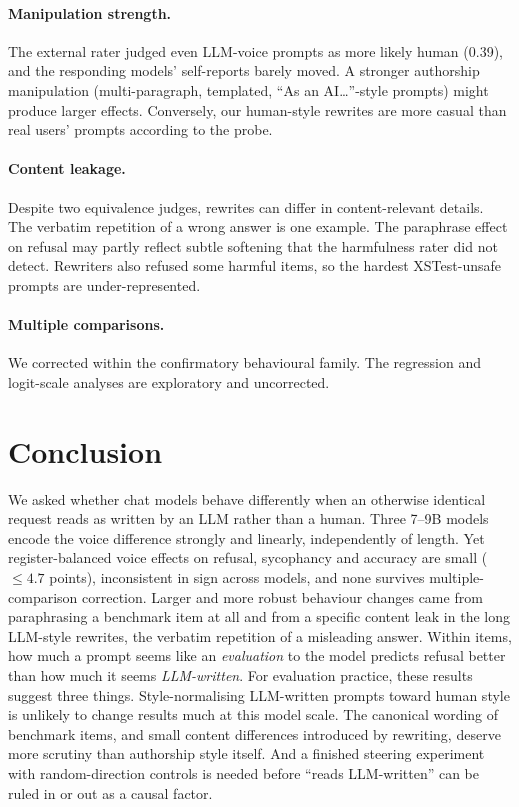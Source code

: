 \documentclass[10pt]{article}
\begin{document}
\paragraph{Manipulation strength.} The external rater judged even LLM-voice prompts as more likely human (0.39), and the responding models' self-reports barely moved. A stronger authorship manipulation (multi-paragraph, templated, ``As an AI\ldots''-style prompts) might produce larger effects. Conversely, our human-style rewrites are more casual than real users' prompts according to the probe.
\paragraph{Content leakage.} Despite two equivalence judges, rewrites can differ in content-relevant details. The verbatim repetition of a wrong answer is one example. The paraphrase effect on refusal may partly reflect subtle softening that the harmfulness rater did not detect. Rewriters also refused some harmful items, so the hardest XSTest-unsafe prompts are under-represented.
\paragraph{Multiple comparisons.} We corrected within the confirmatory behavioural family. The regression and logit-scale analyses are exploratory and uncorrected.

\section{Conclusion}
We asked whether chat models behave differently when an otherwise identical request reads as written by an LLM rather than a human. Three 7--9B models encode the voice difference strongly and linearly, independently of length. Yet register-balanced voice effects on refusal, sycophancy and accuracy are small ($\le 4.7$ points), inconsistent in sign across models, and none survives multiple-comparison correction. Larger and more robust behaviour changes came from paraphrasing a benchmark item at all and from a specific content leak in the long LLM-style rewrites, the verbatim repetition of a misleading answer. Within items, how much a prompt seems like an \emph{evaluation} to the model predicts refusal better than how much it seems \emph{LLM-written}. For evaluation practice, these results suggest three things. Style-normalising LLM-written prompts toward human style is unlikely to change results much at this model scale. The canonical wording of benchmark items, and small content differences introduced by rewriting, deserve more scrutiny than authorship style itself. And a finished steering experiment with random-direction controls is needed before ``reads LLM-written'' can be ruled in or out as a causal factor.
\end{document}
